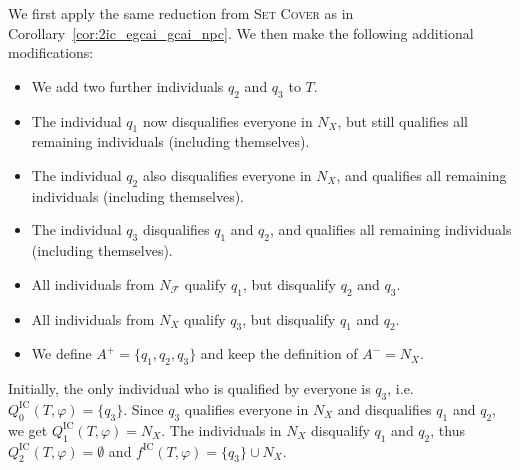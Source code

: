\documentclass[
    12pt,               %
    a4paper,            %
    bibtotoc,           %
    pointlessnumbers,   %
    ngerman,            %
    titlepage,          %
    leqno,              %
    ]{scrarticle}       %
\newcommand\corref{Corollary~\ref}
\begin{document}
\begin{Proof}
We first apply the same reduction from \textsc{Set Cover} as in \corref{cor:2ic_egcai_gcai_npc}. We then make the following additional modifications:

\begin{itemize}[nolistsep]
\item
We add two further individuals $q_2$ and $q_3$ to $T$.
\item
The individual $q_1$ now disqualifies everyone in $N_X$, but still qualifies all remaining individuals (including themselves).
\item
The individual $q_2$ also disqualifies everyone in $N_X$, and qualifies all remaining individuals (including themselves).
\item
The individual $q_3$ disqualifies $q_1$ and $q_2$, and qualifies all remaining individuals (including themselves).
\item
All individuals from $N_\mathcal{F}$ qualify $q_1$, but disqualify $q_2$ and $q_3$.
\item
All individuals from $N_X$ qualify $q_3$, but disqualify $q_1$ and $q_2$.
\item
We define $A^+ = \{ q_1, q_2, q_3 \}$ and keep the definition of $A^- = N_X$.
\end{itemize}

Initially, the only individual who is qualified by everyone is $q_3$, i.e.\@ $Q^{\text{IC}}_0(T, \varphi) = \{q_3\}$. Since $q_3$ qualifies everyone in $N_X$ and disqualifies $q_1$ and $q_2$, we get $Q^{\text{IC}}_1(T, \varphi) = N_X$. The individuals in $N_X$ disqualify $q_1$ and $q_2$, thus $Q^{\text{IC}}_2(T, \varphi) = \emptyset$ and $f^{\text{IC}}(T, \varphi) = \{q_3\} \cup N_X$.


\end{Proof}
\end{document}

